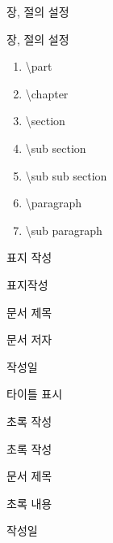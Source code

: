 \documentclass[10pt,xcolor=pdftex,dvipsnames,table,handout]{beamer}
\begin{document}
		\begin{frame}[t]{장, 절의 설정}

			\begin{block} {장, 절의 설정}
			\begin{enumerate}
			\item	\textbackslash part
			\item	\textbackslash chapter
			\item	\textbackslash section
			\item	\textbackslash sub section
			\item	\textbackslash sub sub section
			\item	\textbackslash paragraph
			\item	\textbackslash sub paragraph
			\end{enumerate}
			\end{block}

		\end{frame}




		\begin{frame}[t]{표지 작성}


			\begin{block} {표지작성}
			\begin{description}[1234567890]
			\item [\textbackslash title] 	문서 제목
			\item [\textbackslash author]	문서 저자
			\item [\textbackslash date] 	작성일
			\item [\textbackslash maketitle] 타이틀 표시
			\end{description}
			\end{block}

		\end{frame}




		\begin{frame}[t]{초록 작성}

			\begin{block} {초록 작성}
			\begin{description}[12345678901234567]
			\item [\textbackslash begin\{abstract\}] 	문서 제목
			\item [초록 내용]						초록 내용
			\item [\textbackslash end\{abstract\}] 	작성일
			\end{description}
			\end{block}


		\end{frame}
\end{document}
